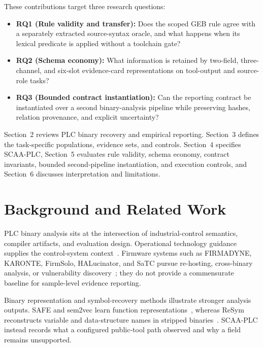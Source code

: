 \documentclass[manuscript,screen,review]{acmart}
\begin{document}
These contributions target three research questions:
\begin{itemize}
\item \textbf{RQ1 (Rule validity and transfer):} Does the scoped GEB rule agree with a separately extracted source-syntax oracle, and what happens when its lexical predicate is applied without a toolchain gate?
\item \textbf{RQ2 (Schema economy):} What information is retained by two-field, three-channel, and six-slot evidence-card representations on tool-output and source-role tasks?
\item \textbf{RQ3 (Bounded contract instantiation):} Can the reporting contract be instantiated over a second binary-analysis pipeline while preserving hashes, relation provenance, and explicit uncertainty?
\end{itemize}

Section~2 reviews PLC binary recovery and empirical reporting. Section~3 defines the task-specific populations, evidence sets, and controls. Section~4 specifies SCAA-PLC, Section~5 evaluates rule validity, schema economy, contract invariants, bounded second-pipeline instantiation, and execution controls, and Section~6 discusses interpretation and limitations.



\section{Background and Related Work}

PLC binary analysis sits at the intersection of industrial-control semantics, compiler artifacts, and evaluation design. Operational technology guidance supplies the control-system context~\cite{nist_sp800_82r3}. Firmware systems such as FIRMADYNE, KARONTE, FirmSolo, HALucinator, and SaTC pursue re-hosting, cross-binary analysis, or vulnerability discovery~\cite{firmadyne_ndss2016,karonte_sp2020,firmsolo_usenix2023,halucinator_usenix2020,satc_tdsc2024}; they do not provide a commensurate baseline for sample-level evidence reporting.

Binary representation and symbol-recovery methods illustrate stronger analysis outputs. SAFE and sem2vec learn function representations~\cite{safe_dimva2019,sem2vec_tosem2023}, whereas ReSym reconstructs variable and data-structure names in stripped binaries~\cite{resym_ccs2024}. SCAA-PLC instead records what a configured public-tool path observed and why a field remains unsupported.
\end{document}
